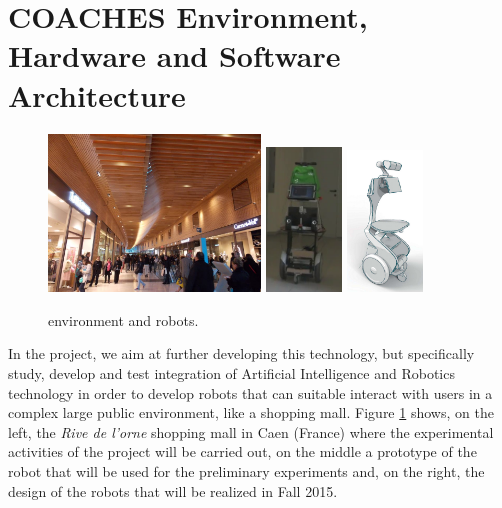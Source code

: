 \section{COACHES Environment, Hardware and Software Architecture}
\vspace{-0.1cm}
\begin{figure}[t!]
\centering
\includegraphics[height=4.2cm]{fig/rivedelorne}\hspace{0.1cm}\hfill
\includegraphics[width=0.18\textwidth]{fig/diago1}\hspace{0.1cm}\hfill
\includegraphics[width=0.18\textwidth]{fig/coaches_robot}
\caption{\coaches environment and robots.}
\label{fig:env}
\end{figure}

In the \coaches project, we aim at further developing this technology, but specifically study, develop and test integration of Artificial Intelligence and Robotics technology in order to develop robots that can suitable interact with users in a complex large public environment, like a shopping mall.
Figure \ref{fig:env} shows, on the left, the \emph{Rive de l'orne} shopping mall in Caen (France) where the experimental activities of the project will be carried out, on the middle a prototype of the robot that will be used for the preliminary experiments and, on the right, the design of the robots that will be realized in Fall 2015.

